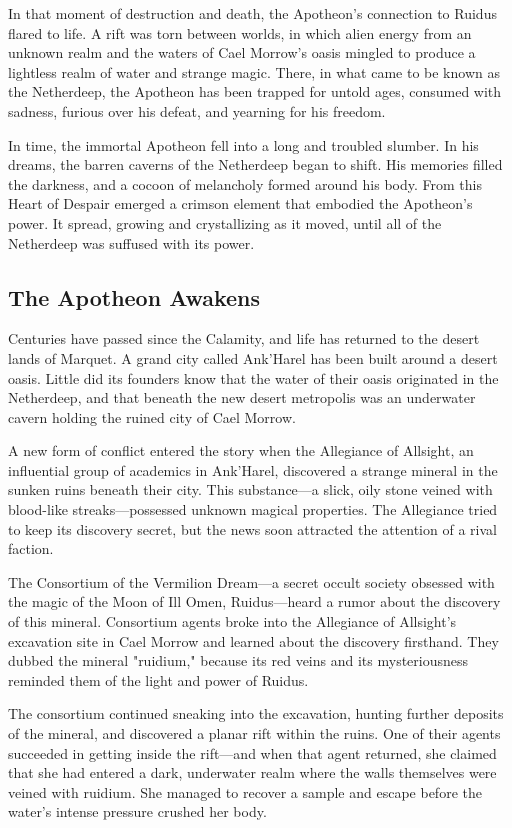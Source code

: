 \documentclass[a4paper, 11pt, bg=full, twocolumn, nooutline]{dndbook}
\begin{document}
In that moment of destruction and death, the Apotheon's connection to Ruidus flared to life. A rift was torn between worlds, in which alien energy from an unknown realm and the waters of Cael Morrow's oasis mingled to produce a lightless realm of water and strange magic. There, in what came to be known as the Netherdeep, the Apotheon has been trapped for untold ages, consumed with sadness, furious over his defeat, and yearning for his freedom.

In time, the immortal Apotheon fell into a long and troubled slumber. In his dreams, the barren caverns of the Netherdeep began to shift. His memories filled the darkness, and a cocoon of melancholy formed around his body. From this Heart of Despair emerged a crimson element that embodied the Apotheon's power. It spread, growing and crystallizing as it moved, until all of the Netherdeep was suffused with its power.

\subsection{The Apotheon Awakens}

Centuries have passed since the Calamity, and life has returned to the desert lands of Marquet. A grand city called Ank'Harel has been built around a desert oasis. Little did its founders know that the water of their oasis originated in the Netherdeep, and that beneath the new desert metropolis was an underwater cavern holding the ruined city of Cael Morrow.

A new form of conflict entered the story when the Allegiance of Allsight, an influential group of academics in Ank'Harel, discovered a strange mineral in the sunken ruins beneath their city. This substance---a slick, oily stone veined with blood-like streaks---possessed unknown magical properties. The Allegiance tried to keep its discovery secret, but the news soon attracted the attention of a rival faction.

The Consortium of the Vermilion Dream---a secret occult society obsessed with the magic of the Moon of Ill Omen, Ruidus---heard a rumor about the discovery of this mineral. Consortium agents broke into the Allegiance of Allsight's excavation site in Cael Morrow and learned about the discovery firsthand. They dubbed the mineral "ruidium," because its red veins and its mysteriousness reminded them of the light and power of Ruidus.

The consortium continued sneaking into the excavation, hunting further deposits of the mineral, and discovered a planar rift within the ruins. One of their agents succeeded in getting inside the rift---and when that agent returned, she claimed that she had entered a dark, underwater realm where the walls themselves were veined with ruidium. She managed to recover a sample and escape before the water's intense pressure crushed her body.
\end{document}
